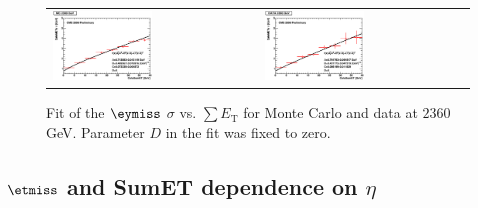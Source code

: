 \begin{figure}[h!]
 \centering
 \begin{tabular}{ll}
  \includegraphics[width=0.5\textwidth]{plots_DataVsMC_MB_2360GeV/final_metysigma_sumet_MC_2360.eps} &
  \includegraphics[width=0.5\textwidth]{plots_DataVsMC_MB_2360GeV/final_metysigma_sumet_DATA_2360.eps} \\
 \end{tabular}
 \caption{\small Fit of the $\eymiss$ $\sigma$ vs. $\sum E_\text{T}$ for Monte Carlo and data at $2360$ GeV. Parameter $D$ in the fit was fixed
          to zero.\label{fig:MExSigma_vs_SumET_2360_fit}}
\end{figure}

\clearpage

\subsection{$\etmiss$ and SumET dependence on $\eta$}


